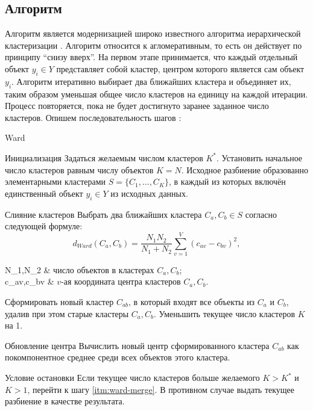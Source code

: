 \documentclass[12pt]{diploma}
\begin{document}
	\subsection{Алгоритм \AWard}
	Алгоритм \AWard является модернизацией широко известного алгоритма иерархической кластеризации \Ward. Алгоритм \Ward \cite{ward-canonical} относится к агломеративным, то есть он действует по принципу ``снизу вверх''. На первом этапе принимается, что каждый отдельный объект $ y_i \in Y $ представляет собой кластер, центром которого является сам объект $ y_i $. Алгоритм \Ward итеративно выбирает два ближайших кластера и объединяет их, таким образом уменьшая общее число кластеров на единицу на каждой итерации. Процесс повторяется, пока не будет достигнуто заранее заданное число кластеров. Опишем последовательность шагов \Ward:
	\begin{algorithm}{Ward}{}	
		\begin{astep}{Инициализация}
			Задаться желаемым числом кластеров $ K^* $. Установить начальное число кластеров равным числу объектов $ K=N $. Исходное разбиение образованно элементарными кластерами $ S=\{C_1,\ldots,C_K\} $, в каждый из которых включён единственный объект $ y_i \in Y $ из исходных данных.
		\end{astep}
		\begin{astep}{Слияние кластеров \label{itm:ward-merge}}
			Выбрать два ближайших кластера $ C_a, C_b \in S $ согласно следующей формуле:
			\begin{equation}\label{eq:ward-dist}
				d_{Ward}(C_a,C_b) = \frac{N_1 N_2}{N_1 + N_2} \sum_{v=1}^{V} (c_{av}-c_{bv})^2,
			\end{equation}
			\begin{conditions}
				N_1,N_2       &  число объектов в кластерах $ C_a, C_b $; \\
				c_{av},c_{bv} &  $ v $-ая координата центра кластеров  $ C_a, C_b $. \\
			\end{conditions}
			
			Сформировать новый кластер $ C_{ab} $, в который входят все объекты из $ C_a $ и $ C_b $, удалив при этом старые кластеры $ C_a, C_b $.	Уменьшить текущее число кластеров $ K $ на 1. 
		\end{astep}
		\begin{astep}{Обновление центра}
			Вычислить новый центр сформированного кластера $ C_{ab} $ как покомпонентное среднее среди всех объектов этого кластера.
		\end{astep}
		\begin{astep}{Условие остановки}
			Если текущее число кластеров больше желаемого $ K>K^* $ и $ K>1 $, перейти к шагу \ref{itm:ward-merge}. В противном случае выдать текущее разбиение в качестве результата.
		\end{astep}
	\end{algorithm}
\end{document}
